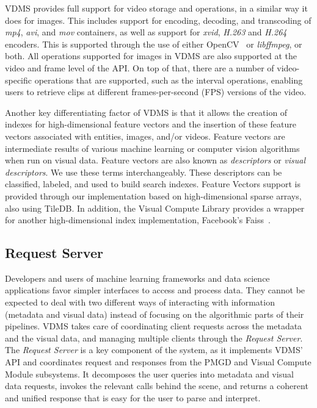 VDMS provides full support for video storage and operations,
in a similar way it does for images.
This includes support for encoding, decoding, and transcoding of
\textit{mp4}, \textit{avi}, and \textit{mov} containers,
as well as support for \textit{xvid}, \textit{H.263} and \textit{H.264} encoders.
This is supported through the use of either OpenCV~\cite{opencv} 
or \textit{libffmpeg}\cite{ffmpeg}, or both.
All operations supported for images in VDMS are also supported at the
video and frame level of the API.
On top of that, there are a number of video-specific operations that
are supported, such as the interval operations,
enabling users to retrieve clips at different
frames-per-second (FPS) versions of the video.

Another key differentiating factor of VDMS is that it allows the creation of
indexes for high-dimensional feature vectors and the insertion of
these feature vectors associated with entities, images, and/or videos.
Feature vectors are intermediate results of various machine
learning or computer vision algorithms when run on visual data.
Feature vectors are also known as \textit{descriptors}
or \textit{visual descriptors}. 
We use these terms interchangeably.
These descriptors can be classified, labeled, and used to build search indexes.
Feature Vectors support is provided through our implementation based
on high-dimensional sparse arrays, also using TileDB.
In addition, the Visual Compute Library provides a wrapper
for another high-dimensional index implementation,
Facebook's Faiss~\cite{faiss}.

\subsection{Request Server}

Developers and users of machine learning frameworks and data science
applications favor simpler interfaces to access and process data. 
They cannot be expected to deal with two different ways of interacting 
with information (metadata and visual data) instead of focusing on the
algorithmic parts of their pipelines.
VDMS takes care of coordinating client requests across the metadata and the
visual data, and managing multiple clients through the \textit{Request Server}.
The \textit{Request Server} is a key component of the system, 
as it implements VDMS' API and coordinates request and responses from 
the PMGD and Visual Compute Module subsystems.
It decomposes the user queries into
metadata and visual data requests, invokes the relevant calls behind the scene,
and returns a coherent and unified response that is easy for the user to parse 
and interpret.

